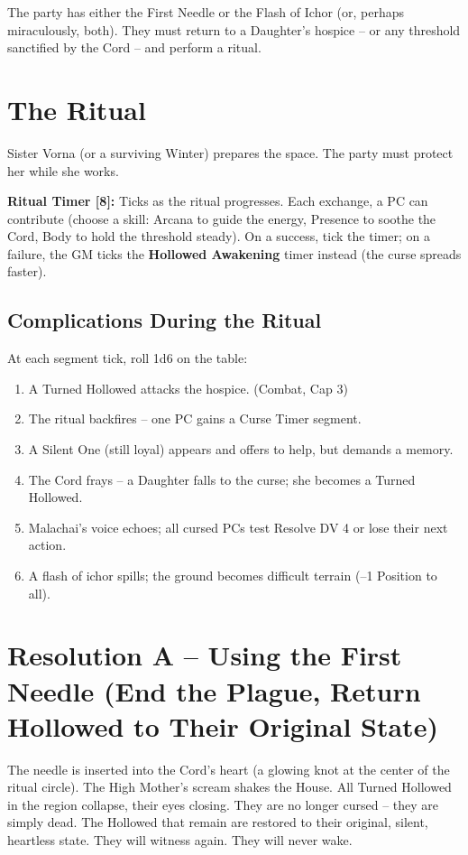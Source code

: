 \documentclass[10pt,twoside]{book}
\begin{document}
The party has either the First Needle or the Flash of Ichor (or, perhaps miraculously, both). They must return to a Daughter's hospice -- or any threshold sanctified by the Cord -- and perform a ritual.

\section{The Ritual}
Sister Vorna (or a surviving Winter) prepares the space. The party must protect her while she works.

\textbf{Ritual Timer [8]:} Ticks as the ritual progresses. Each exchange, a PC can contribute (choose a skill: Arcana to guide the energy, Presence to soothe the Cord, Body to hold the threshold steady). On a success, tick the timer; on a failure, the GM ticks the \textbf{Hollowed Awakening} timer instead (the curse spreads faster).

\subsection{Complications During the Ritual}
At each segment tick, roll 1d6 on the table:
\begin{enumerate}
\item A Turned Hollowed attacks the hospice. (Combat, Cap 3)
\item The ritual backfires -- one PC gains a Curse Timer segment.
\item A Silent One (still loyal) appears and offers to help, but demands a memory.
\item The Cord frays -- a Daughter falls to the curse; she becomes a Turned Hollowed.
\item Malachai's voice echoes; all cursed PCs test Resolve DV 4 or lose their next action.
\item A flash of ichor spills; the ground becomes difficult terrain (--1 Position to all).
\end{enumerate}

\section{Resolution A -- Using the First Needle (End the Plague, Return Hollowed to Their Original State)}
The needle is inserted into the Cord's heart (a glowing knot at the center of the ritual circle). The High Mother's scream shakes the House. All Turned Hollowed in the region collapse, their eyes closing. They are no longer cursed -- they are simply dead. The Hollowed that remain are restored to their original, silent, heartless state. They will witness again. They will never wake.
\end{document}
